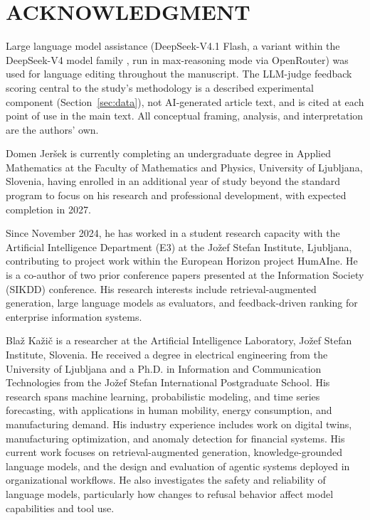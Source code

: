 \section*{ACKNOWLEDGMENT}
Large language model assistance (DeepSeek-V4.1 Flash, a variant within the
DeepSeek-V4 model family \cite{b33}, run in max-reasoning mode via OpenRouter) was
used for language editing throughout the manuscript. The LLM-judge feedback scoring
central to the study's methodology is a described experimental component
(Section~\ref{sec:data}), not AI-generated article text, and is cited at each point
of use in the main text. All conceptual framing, analysis, and interpretation are
the authors' own.

\newpage

\begin{IEEEbiography}{Domen Jer\v{s}ek} is currently completing an undergraduate degree in Applied
Mathematics at the Faculty of Mathematics and Physics, University of Ljubljana,
Slovenia, having enrolled in an additional year of study beyond the standard
program to focus on his research and professional development, with expected
completion in 2027.

Since November 2024, he has worked in a student research capacity with the
Artificial Intelligence Department (E3) at the Jo\v{z}ef Stefan Institute,
Ljubljana, contributing to project work within the European Horizon project
HumAIne. He is a co-author of two prior conference papers presented at the
Information Society (SIKDD) conference. His research interests include
retrieval-augmented generation, large language models as evaluators, and
feedback-driven ranking for enterprise information systems.
\end{IEEEbiography}


\begin{IEEEbiography}{Blaž Kažič} is a researcher at the Artificial Intelligence Laboratory, Jožef Stefan Institute, Slovenia. He received a degree in electrical engineering from the University of Ljubljana and a Ph.D. in Information and Communication Technologies from the Jožef Stefan International Postgraduate School. His research spans machine learning, probabilistic modeling, and time series forecasting, with applications in human mobility, energy consumption, and manufacturing demand. His industry experience includes work on digital twins, manufacturing optimization, and anomaly detection for financial systems. His current work focuses on retrieval-augmented generation, knowledge-grounded language models, and the design and evaluation of agentic systems deployed in organizational workflows. He also investigates the safety and reliability of language models, particularly how changes to refusal behavior affect model capabilities and tool use.
\end{IEEEbiography}



